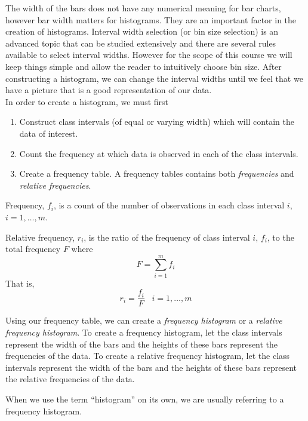 The width of the bars does not have any numerical meaning for bar charts, 
however bar width matters for histograms.
They are an important factor in the creation of histograms. 
Interval width selection (or bin size selection) 
is an advanced topic that can be studied extensively and
there are several rules available to select interval widths.
However for the scope of this course we will keep things simple
and allow the reader to intuitively choose bin size.
After constructing a histogram, we can change the interval widths until
we feel that we have a picture that is a good representation of our data.\\

\noindent
In order to create a histogram, we must first
\begin{enumerate}
\item Construct class intervals (of equal or varying width) which will contain the data of interest.
\item Count the frequency at which data is observed in each of 
the class intervals.
\item Create a frequency table. A frequency tables contains both \textit{frequencies} and \textit{relative frequencies}. 
\end{enumerate}

\begin{definition}[Frequency]	
Frequency, $f_i$, is a count of the number of observations in each class interval $i$, $i=1,\hdots, m$.
\end{definition}

\begin{definition}	
Relative frequency, $r_i$, is the ratio of the frequency of class interval $i$, $f_i$, to the total frequency $F$ where
\[ F = \sum_{i=1}^{m} f_i \]
That is,
\[ r_i = \frac{f_i}{F} \; \; \; i= 1, \hdots, m \]
\end{definition}

Using our frequency table, we can create a \textit{frequency histogram} or a \textit{relative frequency histogram}. To create a frequency histogram, let the class intervals represent the width of the bars and the heights of these bars represent the frequencies of the data. To create a relative frequency histogram, let the class intervals represent the width of the bars and the heights of these bars represent the relative frequencies of the data.


\begin{nt}
When we use the term ``histogram'' on its own, we are usually referring to a frequency histogram.
\end{nt}


